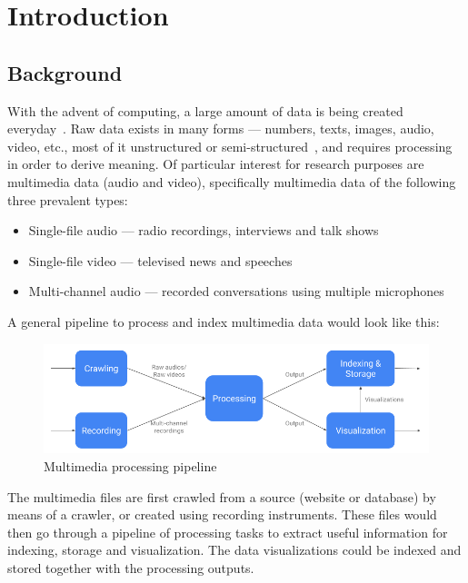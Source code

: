 \chapter{Introduction}

\section{Background}

With the advent of computing, a large amount of data is being created
everyday~\cite{emc}.
Raw data exists in many forms --- numbers, texts, images, audio, video, etc.,
most of it unstructured or semi-structured~\cite{emc},
and requires processing in order to derive meaning. Of particular interest for
research purposes are multimedia data (audio and video), specifically
multimedia data of the following three prevalent types:

\begin{itemize}
    \item Single-file audio --- radio recordings, interviews and talk shows
    \item Single-file video --- televised news and speeches
    \item Multi-channel audio --- recorded conversations using multiple
    microphones
\end{itemize}

A general pipeline to process and index multimedia data would look like this:

\begin{figure}[h]
\begin{center}
    \includegraphics[width=\textwidth]{../images/pipeline.png}
    \caption{Multimedia processing pipeline}
\end{center}
\end{figure}

The multimedia files are first crawled from a source (website or database) by
means of a crawler, or created using recording instruments. These files would
then go through a pipeline of processing tasks to extract useful information
for indexing, storage and visualization. The data visualizations could be
indexed and stored together with the processing outputs. 

